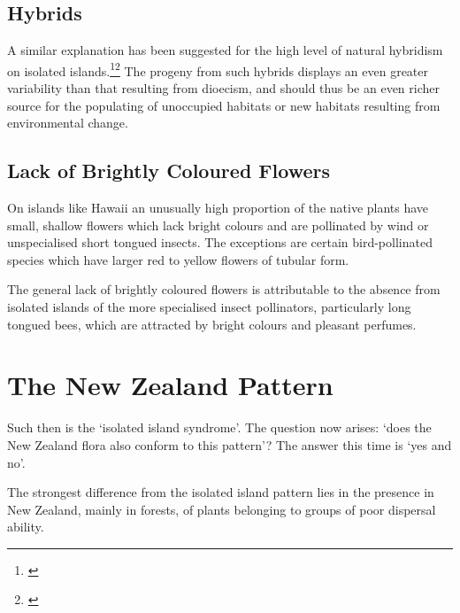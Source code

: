 \subsection{Hybrids}

A similar explanation has been suggested for the high level of natural hybridism on isolated islands.\footnote{\cite{gillett1972role}}\footnote{\cite{rattenbury1962cyclic}} The progeny from such hybrids displays an even greater variability than that resulting from dioecism, and should thus be an even richer source for the populating of unoccupied habitats or new habitats resulting from environmental change.

\subsection{Lack of Brightly Coloured Flowers}

On islands like Hawai{\okina}i an unusually high proportion of the native plants have small, shallow flowers which lack bright colours and are pollinated by wind or unspecialised short tongued insects.
The exceptions are certain bird-pollinated species which have larger red to yellow flowers of tubular form.

The general lack of brightly coloured flowers is attributable to the absence from isolated islands of the more specialised insect pollinators, particularly long tongued bees, which are attracted by bright colours and pleasant perfumes.

\section{The New Zealand Pattern}

Such then is the `isolated island syndrome'.
The question now arises: `does the New Zealand flora also conform to this pattern'? The answer this time is `yes and no'.

The strongest difference from the isolated island pattern lies in the presence in New Zealand, mainly in forests, of plants belonging to groups of poor dispersal ability.

